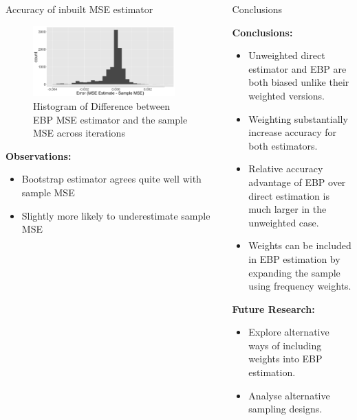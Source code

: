 \documentclass[fleqn,final]{beamer}
\newcommand{\Pheight}{\rule[-5mm]{0cm}{1cm}}
\begin{document}
\begin{frame}
\begin{columns}[t]
\begin{column}{.3\linewidth}
  \begin{block}{ Accuracy of inbuilt MSE estimator \Pheight}
	\begin{center}
	\begin{figure}
		\includegraphics[width=0.9\textwidth]{HistogramMSEEstimate}
		\caption{Histogram of Difference between EBP MSE estimator and the sample MSE across iterations}
	\end{figure}
	\end{center}
	\textbf{Observations:}
	\begin{itemize}
	\item Bootstrap estimator agrees quite well with sample MSE
	\item Slightly more likely to underestimate sample MSE
	\end{itemize}
   \end{block}
\end{column}

%
%

\begin{column}{.3\linewidth}
\begin{block}{Conclusions \Pheight}
\textbf{Conclusions:}
\begin{itemize}
	\item Unweighted direct estimator and EBP are both biased unlike their weighted versions.
	\item Weighting substantially increase accuracy for both estimators.
	\item Relative accuracy advantage of EBP over direct estimation is much larger in the unweighted case.
	\item Weights  can be included in EBP estimation  by expanding the sample using frequency weights.
\end{itemize}
\textbf{Future Research:}
\begin{itemize}
	\item Explore alternative ways of including weights into EBP estimation.
	\item Analyse alternative sampling designs.
\end{itemize}
\end{block}
\end{column}


\end{columns}


\end{frame}
\end{document}
